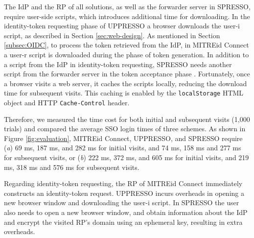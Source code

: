 The IdP and the RP of all solutions, as well as the forwarder server in SPRESSO,
     require user-side scripts, which introduces additional time for downloading. 
In the identity-token requesting phase of UPPRESSO a browser downloads the user-i script,
    as described in Section \ref{sec:web-design}.
As mentioned in Section \ref{subsec:OIDC},
 to process the token retrieved from the IdP, %
    in MITREid Connect a user-r script is downloaded during the phase of token generation.
In addition to a script from the IdP in identity-token requesting,
SPRESSO needs another script from the forwarder server in the token acceptance phase \cite{SPRESSO}.
Fortunately, once a browser visits a web server, it caches the scripts locally, reducing the download time for subsequent visits.
This caching is enabled by the \verb+localStorage+ HTML object \cite{htmlStorageHtml} and HTTP  \texttt{Cache-Control} header.

Therefore, we measured the time cost for both initial and subsequent visits (1,000 trials) and compared the average SSO login times of three schemes.
As shown in Figure \ref{fig:evaluation},
MITREid Connect, UPPRESSO, and SPRESSO require (\emph{a}) 69 ms, 187 ms, and 282 ms for initial visits, and 74 ms, 158 ms and 277 ms for subsequent visits,
 or (\emph{b}) 222 ms, 372 ms, and 605 ms for initial visits, and 219 ms, 318 ms and 576 ms for subsequent visits.

Regarding identity-token requesting, %
the RP of MITREid Connect immediately constructs an identity-token request. %
UPPRESSO incurs overheads in opening a new browser window and downloading the user-i script.
%
%
In SPRESSO the user also needs to open a new browser window, and obtain information about the IdP %
and encrypt the visited RP's domain using an ephemeral key, resulting in extra overheads.

